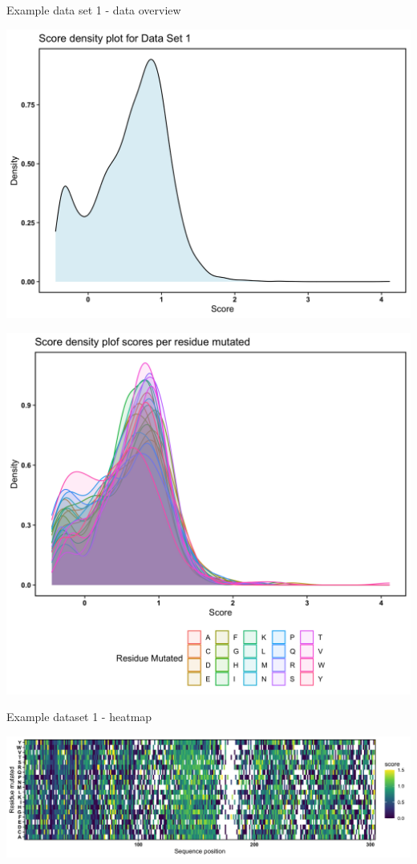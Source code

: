 \documentclass[ignorenonframetext,]{beamer}
\begin{document}
\begin{frame}{Example data set 1 - data overview}
\protect\hypertarget{example-data-set-1---data-overview}{}

\includegraphics[width=1\textwidth,height=\textheight]{density_plots/density_data_set_1.png}

\includegraphics[width=1\textwidth,height=\textheight]{density_plots/density_residue_data_set_1.png}

\end{frame}

\begin{frame}{Example dataset 1 - heatmap}
\protect\hypertarget{example-dataset-1---heatmap}{}

\includegraphics[width=1\textwidth,height=\textheight]{heatmaps/heatmap_data_set_score_1.png}

\end{frame}
\end{document}
